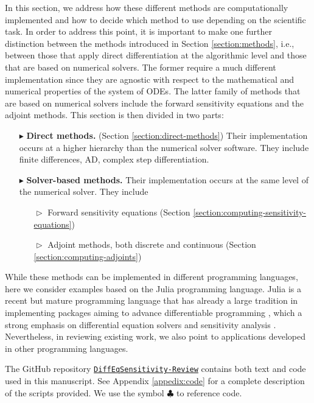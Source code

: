 
In this section, we address how these different methods are computationally implemented and how to decide which method to use depending on the scientific task.
In order to address this point, it is important to make one further distinction between the methods introduced in Section \ref{section:methods}, i.e., between those that apply direct differentiation at the algorithmic level and those that are based on numerical solvers.  
The former require a much different implementation since they are agnostic with respect to the mathematical and numerical properties of the system of ODEs.
The latter family of methods that are based on numerical solvers include the forward sensitivity equations and the adjoint methods.
This section is then divided in two parts:
\begin{itemize}
    \item[$ \blacktriangleright$] \textbf{Direct methods.} (Section \ref{section:direct-methods}) Their implementation occurs at a higher hierarchy than the numerical solver software. They include finite differences, AD, complex step differentiation.
    \item[$ \blacktriangleright$] \textbf{Solver-based methods.} Their implementation occurs at the same level of the numerical solver. They include 
    \begin{itemize}
        \item [$\vartriangleright$] Forward sensitivity equations (Section \ref{section:computing-sensitivity-equations})
        \item [$\vartriangleright$] Adjoint methods, both discrete and continuous (Section \ref{section:computing-adjoints})
    \end{itemize}
\end{itemize}
While these methods can be implemented in different programming languages, here we consider examples based on the Julia programming language. 
Julia is a recent but mature programming language that has already a large tradition in implementing packages aiming to advance differentiable programming \cite{Bezanson_Karpinski_Shah_Edelman_2012, Julialang_2017}, which a strong emphasis on differential equation solvers \cite{Rackauckas_Nie_2016} and sensitivity analysis \cite{rackauckas2020universal}.
Nevertheless, in reviewing existing work, we also point to applications developed in other programming languages.

The GitHub repository \href{https://github.com/ODINN-SciML/DiffEqSensitivity-Review}{\texttt{DiffEqSensitivity-Review}} contains both text and code used in this manuscript. 
See Appendix \ref{appedix:code} for a complete description of the scripts provided. 
We use the symbol $\clubsuit$ to reference code. 